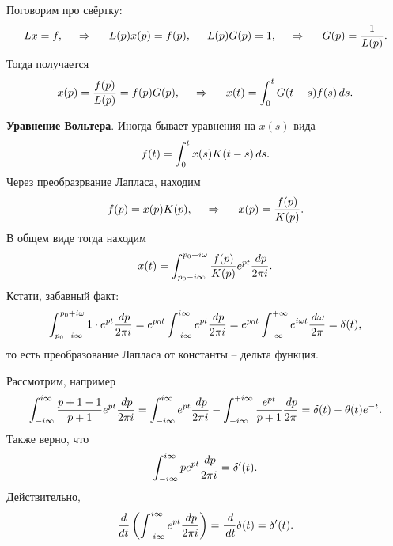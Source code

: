 Поговорим про свёртку:
\begin{equation*}
    L x  = f,
    \hspace{0.5cm} \Rightarrow \hspace{0.5cm}
    L(p) x(p) = f(p),
    \hspace{5 mm} 
    L(p) G(p)  =1,
    \hspace{0.5cm} \Rightarrow \hspace{0.5cm}
    G(p) = \frac{1}{L(p)}.
\end{equation*}
Тогда получается
\begin{equation*}
    x(p) = \frac{f(p)}{L(p)} = f(p) G(p),
    \hspace{0.5cm} \Rightarrow \hspace{0.5cm}
    x(t) = \int_{0}^{t} G(t-s) f(s) \, d s.
\end{equation*}


\textbf{Уравнение Вольтера}. Иногда бывает уравнения на $x(s)$ вида
\begin{equation}
    f(t) = \int_{0}^{t} x(s) K(t-s) \, d s.
\end{equation}
Через преобразрвание Лапласа, находим
\begin{equation}
    f(p) = x(p) K(p),
    \hspace{0.5cm} \Rightarrow \hspace{0.5cm}
    x(p) = \frac{f(p)}{K(p)}. 
\end{equation}
В общем виде тогда находим
\begin{equation*}
    x(t) = \int_{p_0 - i \infty}^{p_0 + i \omega} \frac{f(p)}{K(p)} e^{pt} \frac{\, d p}{2\pi i}.
\end{equation*}
Кстати, забавный факт:
\begin{equation}
    \int_{p_0 - i \infty}^{p_0 + i \omega} 1 \cdot e^{pt} \frac{\, d p}{2 \pi i} = e^{p_0 t} 
    \int_{-i \infty}^{i \infty} e^{p t} \frac{\, d p }{2 \pi i} = 
    e^{p_0 t} \int_{-\infty}^{+\infty} e^{i \omega t} \frac{\, d \omega}{2 \pi} = \delta(t),
\end{equation}
то есть преобразование Лапласа от константы -- дельта функция. 



Рассмотрим, например
\begin{equation*}
    \int_{-i \infty}^{i \infty} \frac{p + 1 -1}{p+1} e^{pt} \frac{\, d p}{2 \pi i} = \int_{- i \infty}^{i \infty}  e^{p t} \frac{\, d p}{2 \pi i} - \int_{-i\infty}^{+i\infty}  \frac{e^{pt}}{p+1} \frac{\, d p}{2 \pi} = \delta(t) - \theta(t) e^{- t}.
\end{equation*}
Также верно, что
\begin{equation*}
    \int_{- i \infty}^{i \infty} p e^{pt} \frac{\, d p}{2 \pi i} = \delta'(t).
\end{equation*}
Действительно,
\begin{equation*}
    \frac{d }{d t} \left(
        \int_{- i \infty}^{i \infty}
         e^{p t} \frac{\, d p}{2 \pi i}
    \right) = \frac{\, d}{\, d t} \delta(t) = \delta'(t).
\end{equation*}

